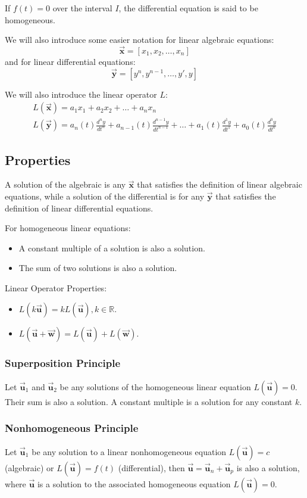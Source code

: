 \documentclass[12pt, landscape, twocolumn]{article}
\let\oldvec\vec
\renewcommand{\vec}[1]{\oldvec{\mathbf{ #1 } } }                    %
\begin{document}
If $f(t)=0$ over the interval $I$, the differential equation is said to be homogeneous.

We will also introduce some easier notation for linear algebraic equations:
\[
\vec{x} = [x_1, x_2, \dots, x_n]
\]
and for linear differential equations:
\[
\vec{y} = [y^n, y^{n-1}, \dots, y\prime, y]
\]

We will also introduce the linear operator $L$:
\[
\begin{aligned}
L(\vec{x}) = a_1x_1 + a_2x_2 + \dots + a_nx_n\\
L(\vec{y}) = a_n(t) \frac{d^ny}{dt^n} + a_{n-1}(t) \frac{d^{n-1}y}{dt^{n-1} } + \dots + a_1(t) \frac{d^1y}{dt^1} + a_0(t) \frac{d^0y}{dt^0}
\end{aligned}
\]

    \subsection{Properties}
    A solution of the algebraic is any $\vec{x}$ that satisfies the definition of linear algebraic equations, while a solution of the differential is for any $\vec{y}$ that satisfies the definition of linear differential equations.

    For homogeneous linear equations:
    \begin{itemize}
    \item A constant multiple of a solution is also a solution.
    \item The sum of two solutions is also a solution.
    \end{itemize}

    Linear Operator Properties:
    \begin{itemize}
    \item $L(k \vec{u}) = k L(\vec{u}), k \in \mathbb{R}$.
    \item $L(\vec{u} + \vec{w}) = L(\vec{u}) + L(\vec{w})$.
    \end{itemize}

    \subsubsection{Superposition Principle}
    Let $\vec{u}_1$ and $\vec{u}_2$ be any solutions of the homogeneous linear equation $L(\vec{u}) = 0$. Their sum is also a solution. A constant multiple is a solution for any constant $k$.

    \subsubsection{Nonhomogeneous Principle}
    Let $\vec{u}_1$ be any solution to a linear nonhomogeneous equation $L(\vec{u}) = c$ (algebraic) or $L(\vec{u}) = f(t)$ (differential), then $\vec{u} = \vec{u}_n + \vec{u}_p$ is also a solution, where $\vec{u}$ is a solution to the associated homogeneous equation $L(\vec{u}) = 0$.
\end{document}
